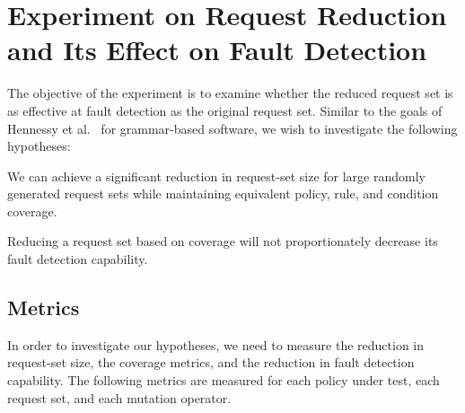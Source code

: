 \section{Experiment on Request Reduction and Its Effect on Fault Detection} \label{sec:experiment}

The objective of the experiment is to examine whether the reduced
request set is as effective at fault detection as the original
request set. Similar to the goals of Hennessy et
al.~\cite{hennessy05:analysis} for grammar-based software, we wish
to investigate the following hypotheses:

We can achieve a significant reduction in request-set size for large
randomly generated request sets while maintaining equivalent policy,
rule, and condition coverage.

Reducing a request set based on coverage will not proportionately
decrease its fault detection capability.

\subsection{Metrics}

In order to investigate our hypotheses, we need to measure the
reduction in request-set size, the coverage metrics, and the
reduction in fault detection capability. The following metrics are
measured for each policy under test, each request set, and each
mutation operator.


